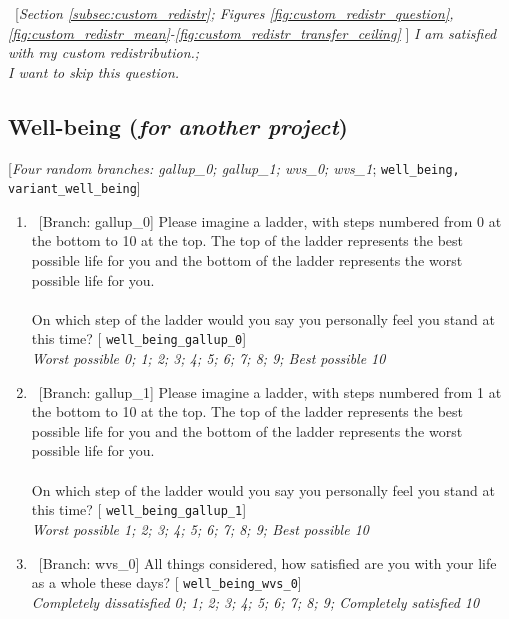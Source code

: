 \documentclass[12pt,english]{article}
\begin{document}
\begin{bibunit}
\begin{enumerate}[resume]
~[\textit{Section \ref{subsec:custom_redistr}; Figures \ref{fig:custom_redistr_question}, \ref{fig:custom_redistr_mean}-\ref{fig:custom_redistr_transfer_ceiling}} 
]
\textit{I am satisfied with my custom redistribution.; \\I want to skip this question.}

\end{enumerate} 

 \subsection*{Well-being (\textit{for another project})} 
  [\textit{Four random branches: gallup\_0; gallup\_1; wvs\_0; wvs\_1}; %
 \verb|well_being, variant_well_being|] 
 \begin{enumerate}[resume] %
\item ~[Branch: gallup\_0] \label{q:well_being_gallup_0} Please imagine a ladder, with steps numbered from 0 at the bottom to 10 at the top. The top of the ladder represents the best possible life for you and the bottom of the ladder represents the worst possible life for you. \\\\On which step of the ladder would you say you personally feel you stand at this time? [%
\verb|well_being_gallup_0|]
  \\ \textit{Worst possible 0; 1; 2; 3; 4; 5; 6; 7; 8; 9; Best possible 10}

\item ~[Branch: gallup\_1] \label{q:well_being_gallup_1} Please imagine a ladder, with steps numbered from 1 at the bottom to 10 at the top. The top of the ladder represents the best possible life for you and the bottom of the ladder represents the worst possible life for you. \\\\On which step of the ladder would you say you personally feel you stand at this time? [%
\verb|well_being_gallup_1|]
  \\ \textit{Worst possible 1; 2; 3; 4; 5; 6; 7; 8; 9; Best possible 10}

\item ~[Branch: wvs\_0] \label{q:well_being_wvs_0} All things considered, how satisfied are you with your life as a whole these days? [%
\verb|well_being_wvs_0|]
  \\ \textit{Completely dissatisfied 0; 1; 2; 3; 4; 5; 6; 7; 8; 9; Completely satisfied 10}


\end{enumerate}
\end{bibunit}
\end{document}
